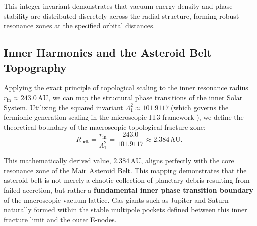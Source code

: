 \documentclass[11pt,a4paper]{article}
\theoremstyle{remark}
\newcommand{\AU}{\,\mathrm{AU}}
\newcommand{\Lone}{\Lambda_1}
\begin{document}
This integer invariant demonstrates that vacuum energy density and phase stability are distributed discretely across the radial structure, forming robust resonance zones at the specified orbital distances.

\subsection{Inner Harmonics and the Asteroid Belt Topography}

Applying the exact principle of topological scaling to the inner resonance radius $r_{\text{in}} \approx 243.0\AU$, we can map the structural phase transitions of the inner Solar System. Utilizing the squared invariant $\Lone^2 \approx 101.9117$ (which governs the fermionic generation scaling in the microscopic IT3 framework \cite{logvinovich2026}), we define the theoretical boundary of the macroscopic topological fracture zone:
\begin{equation}
    R_{\text{belt}} = \frac{r_{\text{in}}}{\Lone^2} = \frac{243.0}{101.9117} \approx 2.384 \AU.
\end{equation}

This mathematically derived value, $2.384\AU$, aligns perfectly with the core resonance zone of the Main Asteroid Belt. This mapping demonstrates that the asteroid belt is not merely a chaotic collection of planetary debris resulting from failed accretion, but rather a \textbf{fundamental inner phase transition boundary} of the macroscopic vacuum lattice. Gas giants such as Jupiter and Saturn naturally formed within the stable multipole pockets defined between this inner fracture limit and the outer E-nodes.
\end{document}
